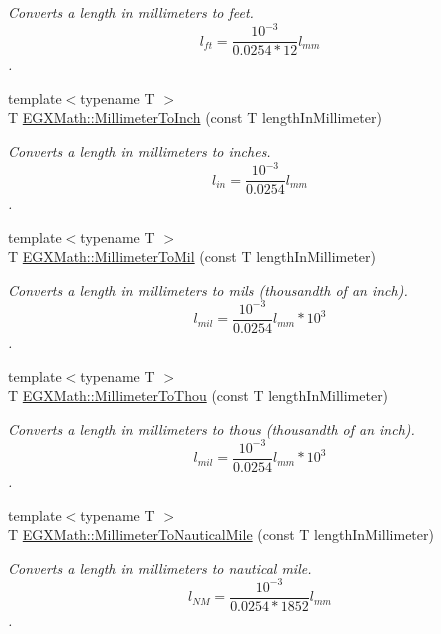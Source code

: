 \begin{DoxyCompactItemize}
\begin{DoxyCompactList}\small\item\em Converts a length in millimeters to feet. \[ l_{ft}= \frac{10^{-3}}{0.0254 * 12} l_{mm} \]. \end{DoxyCompactList}\item 
{\footnotesize template$<$typename T $>$ }\\T \mbox{\hyperlink{group___e_g_x_math-_conversions-_length_conversions-_s_i-_millimeter-_imperial_gaaf0d8029c38ed975edf3805a0a3a53f7}{E\+G\+X\+Math\+::\+Millimeter\+To\+Inch}} (const T length\+In\+Millimeter)
\begin{DoxyCompactList}\small\item\em Converts a length in millimeters to inches. \[ l_{in}= \frac{10^{-3}}{0.0254} l_{mm} \]. \end{DoxyCompactList}\item 
{\footnotesize template$<$typename T $>$ }\\T \mbox{\hyperlink{group___e_g_x_math-_conversions-_length_conversions-_s_i-_millimeter-_imperial_gaf811317f4ce575df4ff0329491e92fac}{E\+G\+X\+Math\+::\+Millimeter\+To\+Mil}} (const T length\+In\+Millimeter)
\begin{DoxyCompactList}\small\item\em Converts a length in millimeters to mils (thousandth of an inch). \[ l_{mil}= \frac{10^{-3}}{0.0254} l_{mm} * 10^{3} \]. \end{DoxyCompactList}\item 
{\footnotesize template$<$typename T $>$ }\\T \mbox{\hyperlink{group___e_g_x_math-_conversions-_length_conversions-_s_i-_millimeter-_imperial_ga099bde3b0f85fbbfbe91f0162a392835}{E\+G\+X\+Math\+::\+Millimeter\+To\+Thou}} (const T length\+In\+Millimeter)
\begin{DoxyCompactList}\small\item\em Converts a length in millimeters to thous (thousandth of an inch). \[ l_{mil}= \frac{10^{-3}}{0.0254} l_{mm} * 10^{3} \]. \end{DoxyCompactList}\item 
{\footnotesize template$<$typename T $>$ }\\T \mbox{\hyperlink{group___e_g_x_math-_conversions-_length_conversions-_s_i-_millimeter-_nautical_ga05ed5fb1300287763d8927ee90315808}{E\+G\+X\+Math\+::\+Millimeter\+To\+Nautical\+Mile}} (const T length\+In\+Millimeter)
\begin{DoxyCompactList}\small\item\em Converts a length in millimeters to nautical mile. \[ l_{NM}= \frac{10^{-3}}{0.0254 * 1852} l_{mm} \]. \end{DoxyCompactList}\item 

\end{DoxyCompactItemize}
